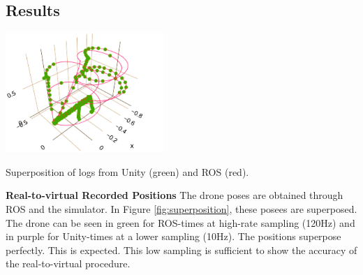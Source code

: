 



\pagebreak
\subsection{Results}


\begin{marginfigure}%
  \raggedright
  \includegraphics[width=6cm]{images/hdi_graphs/ros_vs_unity_logs_inv3.png}
  \caption{Superposition of logs from Unity (green) and ROS (red).}
  \label{fig:superposition}
\end{marginfigure}

 \textbf{Real-to-virtual Recorded Positions  } The drone poses are obtained through ROS and the simulator. In Figure \ref{fig:superposition}, these posees are superposed. The drone can be seen in green for ROS-times at high-rate sampling (120Hz) and in purple for Unity-times at a lower sampling (10Hz). The positions superpose perfectly. This is expected. This low sampling is sufficient to show the accuracy of the real-to-virtual procedure. 

